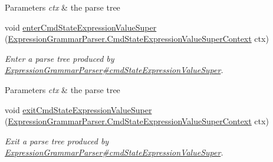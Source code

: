 \begin{DoxyCompactItemize}
\begin{DoxyCompactList}
\begin{DoxyParams}{Parameters}
{\em ctx} & the parse tree\\
\hline
\end{DoxyParams}
 \end{DoxyCompactList}\item 
void \hyperlink{classgov_1_1nasa_1_1jpf_1_1inspector_1_1server_1_1expression_1_1parser_1_1_expression_grammar_base_listener_ada165e786ba570c20f3dd00ffc0d329c}{enter\+Cmd\+State\+Expression\+Value\+Super} (\hyperlink{classgov_1_1nasa_1_1jpf_1_1inspector_1_1server_1_1expression_1_1parser_1_1_expression_grammar_pa66c003646cac4c60d53e10c6587465ef}{Expression\+Grammar\+Parser.\+Cmd\+State\+Expression\+Value\+Super\+Context} ctx)
\begin{DoxyCompactList}\small\item\em Enter a parse tree produced by \hyperlink{classgov_1_1nasa_1_1jpf_1_1inspector_1_1server_1_1expression_1_1parser_1_1_expression_grammar_parser_ae563e67295fa935ca387e0ff9ec0d599}{Expression\+Grammar\+Parser\#cmd\+State\+Expression\+Value\+Super}.


\begin{DoxyParams}{Parameters}
{\em ctx} & the parse tree\\
\hline
\end{DoxyParams}
 \end{DoxyCompactList}\item 
void \hyperlink{classgov_1_1nasa_1_1jpf_1_1inspector_1_1server_1_1expression_1_1parser_1_1_expression_grammar_base_listener_afd6fd420fe0d4a91b00434a3495e99fe}{exit\+Cmd\+State\+Expression\+Value\+Super} (\hyperlink{classgov_1_1nasa_1_1jpf_1_1inspector_1_1server_1_1expression_1_1parser_1_1_expression_grammar_pa66c003646cac4c60d53e10c6587465ef}{Expression\+Grammar\+Parser.\+Cmd\+State\+Expression\+Value\+Super\+Context} ctx)
\begin{DoxyCompactList}\small\item\em Exit a parse tree produced by \hyperlink{classgov_1_1nasa_1_1jpf_1_1inspector_1_1server_1_1expression_1_1parser_1_1_expression_grammar_parser_ae563e67295fa935ca387e0ff9ec0d599}{Expression\+Grammar\+Parser\#cmd\+State\+Expression\+Value\+Super}.



\end{DoxyCompactList}
\end{DoxyCompactItemize}
